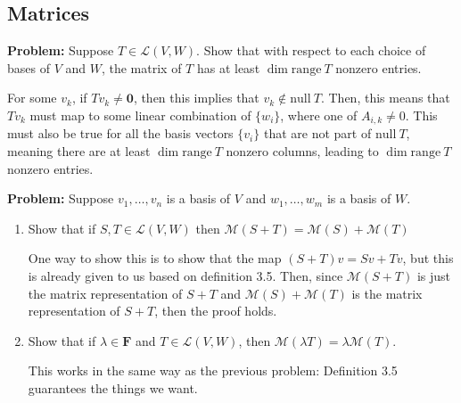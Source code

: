 \documentclass[10pt]{article}
\newcommand{\F}{\mathbf F}
\newcommand{\range}{\mathrm{range \ }}
\renewcommand{\null}{\mathrm{null \ }}
\newenvironment{problem}{\textbf{Problem:}}{}
\begin{document}
	\subsection{Matrices}

	\begin{problem}
		Suppose \( T \in \mathcal L(V, W) \). Show that with respect to each choice of bases of  \( V \) and \( W \), 
		the matrix of \( T \) has at least \( \dim \range T \) nonzero entries. 
	\end{problem}

	\begin{solution}
		For some \( v_k \), if \( Tv_k \neq \mathbf 0 \), then this implies that \( v_k \not \in \null T \). Then, 
		this means that \( Tv_k \) must map to some linear combination of \( \{w_i\}  \), where one of 
		\( A_{i, k} \neq 0 \). This must also be true for all the basis vectors \( \{v_i\}  \) that 
		are not part of \( \null T \), meaning there are at least \( \dim \range T \) nonzero columns, leading to 
		\( \dim \range T \) nonzero entries. 
	\end{solution}

	
	\begin{problem}
		Suppose \( v_1, \dots, v_n \) is a basis of \( V \) and \( w_1, \dots, w_m \) is a basis of \( W \). 
		\begin{enumerate}[label=\alph*)]
			\item Show that if \( S, T \in \mathcal L(V, W) \) then 
				\( \mathcal M(S + T) = \mathcal M(S) + \mathcal M(T) \) 

				\begin{solution}
					One way to show this is to show that the map \( (S + T)v = Sv + Tv \), but this is already given 
					to us based on definition 3.5. Then, since \( \mathcal M(S + T) \) is just the matrix 
					representation of \( S + T \) and \( \mathcal M(S) + \mathcal M(T) \) is the matrix representation 
					of \( S + T \), then the proof holds. 
				\end{solution}
			\item Show that if \( \lambda \in \F \) and \( T \in \mathcal L(V, W) \), then \( \mathcal M(\lambda T)
				= \lambda \mathcal M(T)\). 

				\begin{solution}
					This works in the same way as the previous problem: Definition 3.5 guarantees the things we want. 
				\end{solution}
		\end{enumerate}
	\end{problem}
\end{document}
